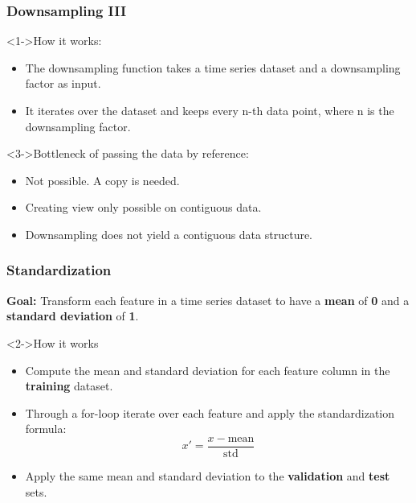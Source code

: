 \documentclass[t,english]{beamer}
\begin{document}
\begin{frame}
  \frametitle{Downsampling III}
  \begin{block}<1->{How it works:}
    \begin{itemize}
      \item<1-> The downsampling function takes a time series dataset and a downsampling factor as input.
      \item<2-> It iterates over the dataset and keeps every n-th data point, where n is the downsampling factor.
    \end{itemize}
  \end{block}

  \begin{block}<3->{Bottleneck of passing the data by reference:}
    \begin{itemize}
      \item<3-> Not possible. A copy is needed.
      \item <4-> Creating view only possible on contiguous data.
      \item <5-> Downsampling does not yield a contiguous data structure.
    \end{itemize}
  \end{block}
\end{frame}

\begin{frame}
  \frametitle{Standardization}
  \textbf{Goal:} Transform each feature in a time series dataset to have a \textbf{mean} of \textbf{0} and a \textbf{standard deviation} of \textbf{1}.

  \begin{block}<2->{How it works}
    \begin{itemize}
      \item<2-> Compute the mean and standard deviation for each feature column in the \textbf{training} dataset.
      \item<3-> Through a for-loop iterate over each feature and apply the standardization formula:
            \begin{equation}
              x' = \frac{x - \text{mean}}{\text{std}}
            \end{equation}
      \item<4-> Apply the same mean and standard deviation to the \textbf{validation} and \textbf{test} sets.
    \end{itemize}
  \end{block}
\end{frame}
\end{document}
